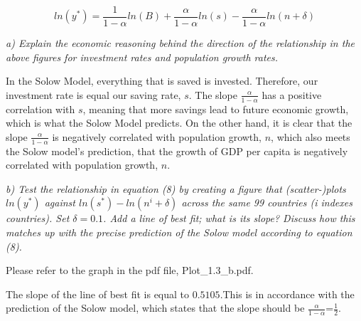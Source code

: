 \documentclass[11pt]{article} %
\begin{document}
\begin{equation}
    ln(y^*)=\frac{1}{1-\alpha}ln(B)+\frac{\alpha}{1-\alpha}ln(s)-\frac{\alpha}{1-\alpha}ln(n+\delta)
\end{equation}

\noindent \textit{a) Explain the economic reasoning behind the direction of the relationship in the above
figures for investment rates and population growth rates.}

In the Solow Model, everything that is saved is invested. Therefore, our investment rate is equal our saving rate, $s$. The slope $\frac{\alpha}{1-\alpha}$ has a positive correlation with $s$, meaning that more savings lead to future economic growth, which is what the Solow Model predicts. On the other hand, it is clear that the slope $\frac{\alpha}{1-\alpha}$ is negatively correlated with population growth, $n$, which also meets the Solow model's prediction, that the growth of GDP per capita is negatively correlated with population growth, $n$. \par

\noindent \textit{b) Test the relationship in equation (8) by creating a figure that (scatter-)plots $ln(y^*)$
against $ln(s^*)-ln(n^i+\delta)$ across the same 99 countries (i indexes countries). Set
$\delta = 0.1$. Add a line of best fit; what is its slope? Discuss how this matches up with the
precise prediction of the Solow model according to equation (8).}

 Please refer to the graph in the pdf file, Plot{_}1.3{_}b.pdf. \par

The slope of the line of best fit is equal to $0.5105$.This is in accordance with the prediction of the Solow model, which states that the slope should be $\frac{\alpha}{1-\alpha}$=$\frac 1 2$.
\end{document}
